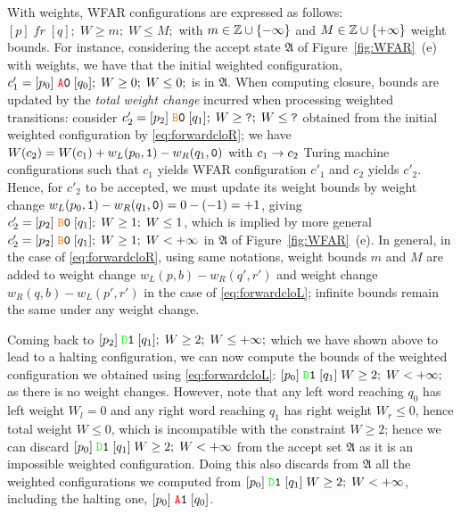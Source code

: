 With weights, WFAR configurations are expressed as follows: $[p] \; fr \; [q];\; W \geq m; \; W \leq M;$ with $m \in \mathbb{Z} \cup\{-\infty\}$ and $M \in \mathbb{Z} \cup \{+\infty\}$ weight bounds. For instance, considering the accept state $\mathfrak{A}$ of Figure~\ref{fig:WFAR}~(e) with weights, we have that the initial weighted configuration, $c'_1 = [p_0] \; \texttt{\stateA}\szero \; [q_0];\; W \geq 0;\; W \leq 0;$ is in $\mathfrak{A}$. When computing closure, bounds are updated by the \textit{total weight change} incurred when processing weighted transitions: consider $c'_2 = [p_2] \; \texttt{\stateB}\szero \; [q_1];\; W \geq \texttt{?};\; W \leq \texttt{?}$ obtained from the initial weighted configuration by \eqref{eq:forwardcloR}; we have $W(c_2) = W(c_1) + w_L(p_0,\texttt{1}) - w_R(q_1, \texttt{0})$ with $c_1 \to c_2$ Turing machine configurations such that $c_1$ yields WFAR configuration $c'_1$ and $c_2$ yields $c'_2$. Hence, for $c'_2$ to be accepted, we must update its weight bounds by weight change $w_L(p_0,\texttt{1}) - w_R(q_1, \texttt{0}) = 0 - (- 1) = +1$, giving $c'_2 = [p_2] \; \texttt{\stateB}\szero \; [q_1];\; W \geq 1;\; W \leq 1$, which is implied by more general $c'_2 = [p_2] \; \texttt{\stateB}\szero \; [q_1];\; W \geq 1;\; W < +\infty$ in $\mathfrak{A}$ of Figure~\ref{fig:WFAR}~(e). In general, in the case of \eqref{eq:forwardcloR}, using same notations, weight bounds $m$ and $M$ are added to weight change $w_L(p,b) - w_R(q', r')$ and weight change $w_R(q,b) - w_L(p',r')$ in the case of \eqref{eq:forwardcloL}; infinite bounds remain the same under any weight change.

Coming back to $[p_2] \; \texttt{\stateD}\sone \; [q_1];\; W \geq 2;\; W \leq + \infty;$ which we have shown above to lead to a halting configuration, we can now compute the bounds of the weighted configuration we obtained using \eqref{eq:forwardcloL}: $[p_0] \; \texttt{\stateD}\sone \; [q_1]\; W \geq 2; \; W < +\infty;$ as there is no weight changes. However, note that any left word reaching $q_0$ has left weight $W_l = 0$ and any right word reaching $q_1$ has right weight $W_r \leq 0$, hence total weight $W \leq 0$, which is incompatible with the constraint $W \geq 2$; hence we can discard $[p_0] \; \texttt{\stateD}\sone \; [q_1]\; W \geq 2; \; W < +\infty$ from the accept set $\mathfrak{A}$ as it is an impossible weighted configuration. Doing this also discards from $\mathfrak{A}$ all the weighted configurations we computed from $[p_0] \; \texttt{\stateD}\sone \; [q_1]\; W \geq 2; \; W < +\infty$, including the halting one, $[p_0] \; \texttt{\stateA}\sone \; [q_0] $.

